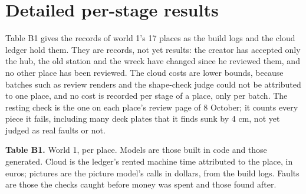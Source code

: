 \section{Detailed per-stage results}\label{detailed-per-stage-results}

Table B1 gives the records of world 1's 17 places as the build logs and the cloud ledger hold them. They are records, not yet results: the creator has accepted only the hub, the old station and the wreck have changed since he reviewed them, and no other place has been reviewed. The cloud costs are lower bounds, because batches such as review renders and the shape-check judge could not be attributed to one place, and no cost is recorded per stage of a place, only per batch. The resting check is the one on each place's review page of 8 October; it counts every piece it fails, including many deck plates that it finds sunk by 4 cm, not yet judged as real faults or not.

\textbf{Table B1.} World 1, per place. Models are those built in code and those generated. Cloud is the ledger's rented machine time attributed to the place, in euros; pictures are the picture model's calls in dollars, from the build logs. Faults are those the checks caught before money was spent and those found after.

